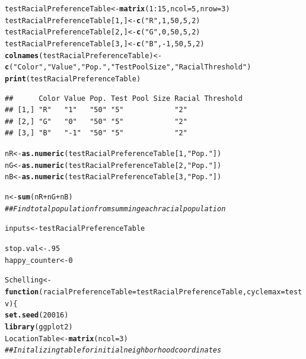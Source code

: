 \documentclass{article}\usepackage[]{graphicx}\usepackage[]{color}
\makeatletter
\newcommand{\hlnum}[1]{\textcolor[rgb]{0.686,0.059,0.569}{#1}}%
\newcommand{\hlstr}[1]{\textcolor[rgb]{0.192,0.494,0.8}{#1}}%
\newcommand{\hlcom}[1]{\textcolor[rgb]{0.678,0.584,0.686}{\textit{#1}}}%
\newcommand{\hlopt}[1]{\textcolor[rgb]{0,0,0}{#1}}%
\newcommand{\hlstd}[1]{\textcolor[rgb]{0.345,0.345,0.345}{#1}}%
\newcommand{\hlkwa}[1]{\textcolor[rgb]{0.161,0.373,0.58}{\textbf{#1}}}%
\newcommand{\hlkwb}[1]{\textcolor[rgb]{0.69,0.353,0.396}{#1}}%
\newcommand{\hlkwc}[1]{\textcolor[rgb]{0.333,0.667,0.333}{#1}}%
\newcommand{\hlkwd}[1]{\textcolor[rgb]{0.737,0.353,0.396}{\textbf{#1}}}%
\newenvironment{kframe}{%
 \def\at@end@of@kframe{}%
 \ifinner\ifhmode%
  \def\at@end@of@kframe{\end{minipage}}%
  \begin{minipage}{\columnwidth}%
 \fi\fi%
 \def\FrameCommand##1{\hskip\@totalleftmargin \hskip-\fboxsep
 \colorbox{shadecolor}{##1}\hskip-\fboxsep
     \hskip-\linewidth \hskip-\@totalleftmargin \hskip\columnwidth}%
 \MakeFramed {\advance\hsize-\width
   \@totalleftmargin\z@ \linewidth\hsize
   \@setminipage}}%
 {\par\unskip\endMakeFramed%
 \at@end@of@kframe}
\newenvironment{knitrout}{}{} %
\makeatother
\begin{document}
\begin{knitrout}
\begin{kframe}
\begin{alltt}
\hlstd{testRacialPreferenceTable} \hlkwb{<-} \hlkwd{matrix}\hlstd{(}\hlnum{1}\hlopt{:}\hlnum{15}\hlstd{,} \hlkwc{ncol} \hlstd{=} \hlnum{5}\hlstd{,} \hlkwc{nrow} \hlstd{=} \hlnum{3}\hlstd{)}
\hlstd{testRacialPreferenceTable[}\hlnum{1}\hlstd{,]} \hlkwb{<-} \hlkwd{c}\hlstd{(}\hlstr{"R"}\hlstd{,}\hlnum{1}\hlstd{,} \hlnum{50}\hlstd{,} \hlnum{5}\hlstd{,} \hlnum{2}\hlstd{)}
\hlstd{testRacialPreferenceTable[}\hlnum{2}\hlstd{,]} \hlkwb{<-} \hlkwd{c}\hlstd{(}\hlstr{"G"}\hlstd{,} \hlnum{0}\hlstd{,} \hlnum{50}\hlstd{,} \hlnum{5}\hlstd{,} \hlnum{2}\hlstd{)}
\hlstd{testRacialPreferenceTable[}\hlnum{3}\hlstd{,]} \hlkwb{<-} \hlkwd{c}\hlstd{(}\hlstr{"B"}\hlstd{,} \hlopt{-}\hlnum{1}\hlstd{,} \hlnum{50}\hlstd{,} \hlnum{5}\hlstd{,} \hlnum{2}\hlstd{)}
\hlkwd{colnames}\hlstd{(testRacialPreferenceTable)} \hlkwb{<-} \hlkwd{c}\hlstd{(}\hlstr{"Color"}\hlstd{,} \hlstr{"Value"}\hlstd{,} \hlstr{"Pop."}\hlstd{,} \hlstr{"Test Pool Size"}\hlstd{,} \hlstr{"Racial Threshold"}\hlstd{)}
\hlkwd{print}\hlstd{(testRacialPreferenceTable)}
\end{alltt}
\begin{verbatim}
##      Color Value Pop. Test Pool Size Racial Threshold
## [1,] "R"   "1"   "50" "5"            "2"             
## [2,] "G"   "0"   "50" "5"            "2"             
## [3,] "B"   "-1"  "50" "5"            "2"
\end{verbatim}
\begin{alltt}
\hlstd{nR} \hlkwb{<-} \hlkwd{as.numeric}\hlstd{(testRacialPreferenceTable[}\hlnum{1}\hlstd{,}\hlstr{"Pop."}\hlstd{])}
\hlstd{nG} \hlkwb{<-} \hlkwd{as.numeric}\hlstd{(testRacialPreferenceTable[}\hlnum{2}\hlstd{,}\hlstr{"Pop."}\hlstd{])}
\hlstd{nB} \hlkwb{<-} \hlkwd{as.numeric}\hlstd{(testRacialPreferenceTable[}\hlnum{3}\hlstd{,}\hlstr{"Pop."}\hlstd{])}

\hlstd{n} \hlkwb{<-} \hlkwd{sum}\hlstd{(nR} \hlopt{+} \hlstd{nG} \hlopt{+} \hlstd{nB)}
\hlcom{## Find total population from summing each racial population}

\hlstd{inputs} \hlkwb{<-} \hlstd{testRacialPreferenceTable}

\hlstd{stop.val} \hlkwb{<-} \hlnum{.95}
\hlstd{happy_counter} \hlkwb{<-} \hlnum{0}


\hlstd{Schelling} \hlkwb{<-} \hlkwa{function}\hlstd{(}\hlkwc{racialPreferenceTable} \hlstd{= testRacialPreferenceTable,} \hlkwc{cyclemax} \hlstd{= testv)\{}
  \hlkwd{set.seed}\hlstd{(}\hlnum{20016}\hlstd{)}
  \hlkwd{library}\hlstd{(ggplot2)}
  \hlstd{LocationTable} \hlkwb{<-} \hlkwd{matrix}\hlstd{(}\hlkwc{ncol} \hlstd{=} \hlnum{3}\hlstd{)}
  \hlcom{## Initalizing table for initial neighborhood coordinates}


\end{alltt}
\end{kframe}
\end{knitrout}
\end{document}
